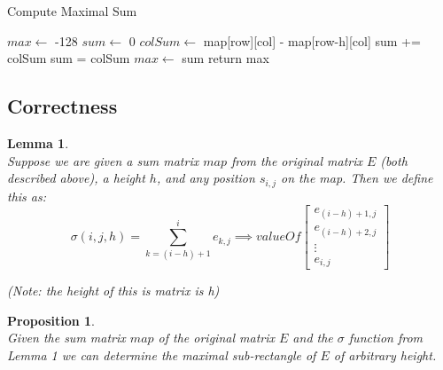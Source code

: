 \documentclass[12pt]{article}
\newtheorem{lemma}[theorem]{Lemma}
\newtheorem{proposition}[theorem]{Proposition}
\begin{document}
\begin{algorithm}[H]
\caption{Compute Maximal Sum}
\begin{algorithmic}
        \State $max \gets$ -128
            \State $sum \gets$ 0
                    \State $colSum \gets$ map[row][col] - map[row-h][col]
                        \State sum += colSum
                    \Else
                        \State sum = colSum
                    \EndIf
                        \State $max \gets$ sum
                    \EndIf
                \EndFor
            \EndFor
        \EndFor
        \State return max
    \EndProcedure
\end{algorithmic}
\end{algorithm}



\subsection{Correctness}
\begin{lemma}
~ \\ \indent Suppose we are given a sum matrix $map$ from the original matrix $E$ (both described
above), a height $h$, and any position $s_{i,j}$ on the map. Then we define this as:\\
\[
\sigma(i,j,h) = \sum\limits_{k=(i-h)+1}^{i} e_{k,j} \implies valueOf
\begin{bmatrix}
    e_{(i-h)+1,j}   \\
    e_{(i-h)+2,j}   \\
    \vdots          \\
    e_{i,j}
\end{bmatrix}
\]
\begin{center}(Note: the height of this is matrix is h)\end{center}
\end{lemma}

\begin{proposition}
~ \\ \indent Given the sum matrix $map$ of the original matrix $E$ and the $\sigma$ function from
Lemma 1 we can determine the maximal sub-rectangle of $E$ of arbitrary height.
\end{proposition}
\end{document}
